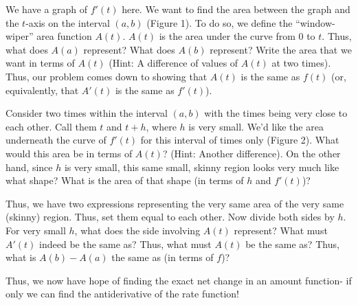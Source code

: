 \documentclass{ximera}
\begin{document}
  \begin{image}
 \end{image}

We have a graph of $f'(t)$ here.  We want to find the area between the graph and the $t$-axis on the interval $(a, b)$ (Figure 1).  To do so, we define the ``window-wiper'' area function  $A(t)$. $A(t)$  is the area under the curve from $0$ to $t$.  Thus, what does $A(a)$ represent?  What does $A(b)$ represent?  Write the area that we want in terms of  $A(t)$ (Hint:  A difference of values of $A(t)$ at two times).  Thus, our problem comes down to showing that $A(t)$ is the same as  $f(t)$ (or, equivalently, that $A'(t)$ is the same as $f'(t)$).

Consider two times within the interval $(a, b)$ with the times being very close to each other.  Call them $t$ and  $t+h$, where $h$ is very small.  We'd like the area underneath the curve of $f'(t)$ for this interval of times only (Figure 2). What would this area be in terms of  $A(t)$? (Hint: Another difference).  On the other hand, since $h$ is very small, this same small, skinny region looks very much like what shape?  What is the area of that shape (in terms of $h$ and  $f'(t)$)?

Thus, we have two expressions representing the very same area of the very same (skinny) region.  Thus, set them equal to each other.  Now divide both sides by $h$.  For very small $h$, what does the side involving $A(t)$ represent?  What must $A'(t)$ indeed be the same as?  Thus, what must $A(t)$ be the same as?  Thus, what is $A(b) - A(a)$  the same as (in terms of $f$)?

Thus, we now have hope of finding the exact net change in an amount function- if only we can find the antiderivative of the rate function!
\end{document}
